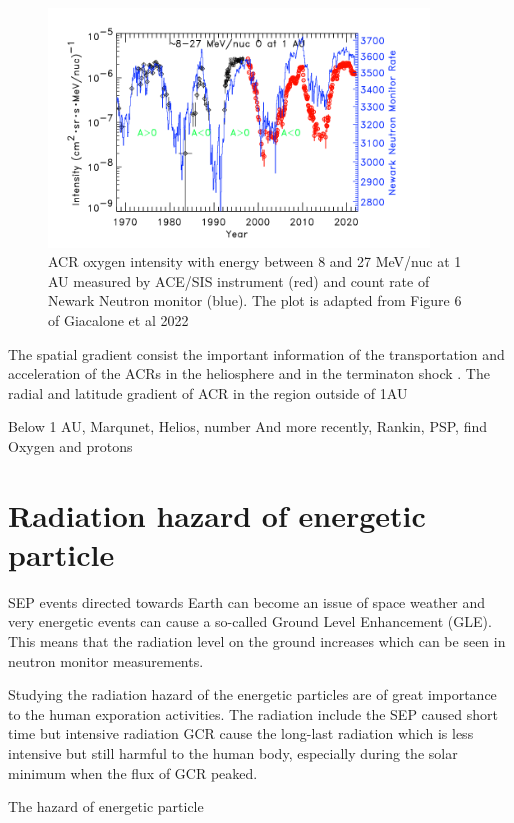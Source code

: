 \begin{figure}
	\centering
	\includegraphics[width = 0.9\textwidth]{images/ACR_solarmodulation.png}
	\caption{ACR oxygen intensity with energy between 8 and 27 MeV/nuc at 1 AU measured by ACE/SIS instrument (red) and count rate of Newark Neutron monitor (blue). The plot is adapted from Figure 6 of Giacalone et al 2022}
	\label{Fig:ACR_solarmodulation}
\end{figure}

The spatial gradient consist the important information of the transportation and acceleration of the ACRs in the heliosphere and in the terminaton shock \cite{Rankin 2020}. 
The radial and latitude gradient of ACR in the region outside of 1AU

Below 1 AU, Marqunet, Helios, number 
And more recently, Rankin, PSP, find Oxygen and protons

\section{Radiation hazard of energetic particle}

SEP events directed towards Earth can become an issue of space weather and
very energetic events can cause a so-called Ground Level Enhancement (GLE).
This means that the radiation level on the ground increases which can be seen in
neutron monitor measurements.

Studying the radiation hazard of the energetic particles are of great importance to the human exporation activities.
The radiation include the SEP caused short time but intensive radiation
GCR cause the long-last radiation which is less intensive but still harmful to the human body, especially during the solar minimum when the flux of GCR peaked.

The hazard of energetic particle 

